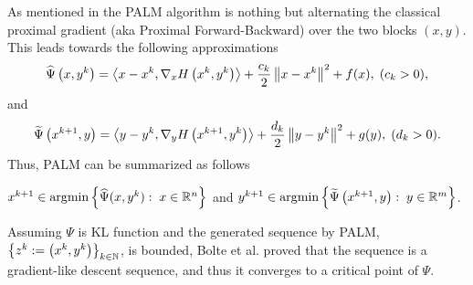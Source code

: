 As mentioned in \cite{BST2014} the PALM algorithm is nothing but alternating the classical proximal gradient (aka Proximal Forward-Backward) over the two blocks $(x,y)$. This leads towards the following approximations 
\begin{equation*}
	\widehat{\Psi}\left(x,y^k\right) = \left\langle x-x^k, \nabla_x H\left( x^k, y^k \right)\right\rangle + \frac{c_k}{2}\left\Vert {x-x^k} \right\Vert^2 + f(x), \; (c_k>0),
\end{equation*}
and
\begin{equation*}
	\widetilde{\Psi}\left(x^{k+1},y\right) = \left\langle y-y^k, \nabla_y H\left( x^{k+1}, y^k \right)\right\rangle + \frac{d_k}{2}\left\Vert {y-y^k} \right\Vert^2 + g(y), \; (d_k>0).
\end{equation*}
Thus, PALM can be summarized as follows
\begin{center}
$x^{k+1} \in \arg\!\min \left\lbrace \widehat{\Psi}(x,y^k) : \; x \in \mathbb{R}^n \right\rbrace$ \quad and \quad $y^{k+1} \in \arg\!\min \left\lbrace \widetilde{\Psi}\left(x^{k+1},y\right) : \; y \in \mathbb{R}^m \right\rbrace$.
\end{center}
Assuming $\Psi$ is KL function and the generated sequence by PALM, $\left\lbrace z^k:=\left( x^k, y^k\right)\right\rbrace_{k \in \mathbb{N}}$, is bounded, Bolte et al. \cite{BST2014} proved that the sequence is a gradient-like descent sequence, and thus it converges to a critical point of $\Psi$. 
